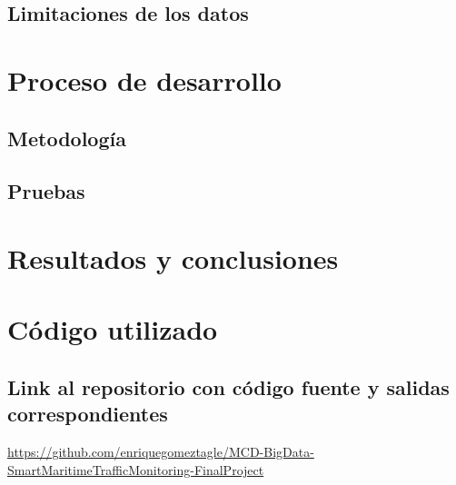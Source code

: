 \documentclass[10pt]{article}
\begin{document}
\subsection{Limitaciones de los datos} %
\section{Proceso de desarrollo}
\subsection{Metodología} %
\subsection{Pruebas} %
\section{Resultados y conclusiones} %
\section{Código utilizado}
\subsection{Link al repositorio con código fuente y salidas correspondientes}
\url{https://github.com/enriquegomeztagle/MCD-BigData-SmartMaritimeTrafficMonitoring-FinalProject}
\end{document}
